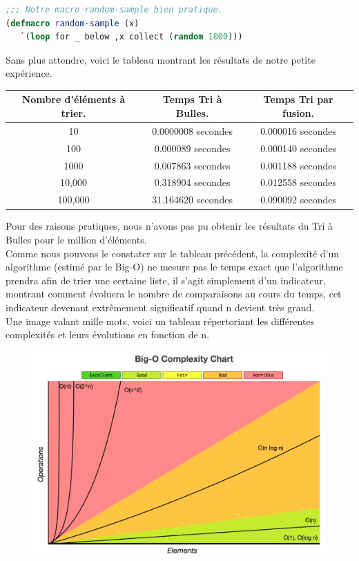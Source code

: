 \documentclass[a4paper, 12pt]{article}
\numberwithin{equation}{subsection}
\begin{document}
\begin{lstlisting}[language=Lisp]
;;; Notre macro random-sample bien pratique.
(defmacro random-sample (x)
   `(loop for _ below ,x collect (random 1000)))
\end{lstlisting}
Sans plus attendre, voici le tableau montrant les résultats de notre petite expérience.
\begin{table}[H]
  \begin{tabular}{|c|c|c|}
    \hline {\bf Nombre d'éléments à trier.} & {\bf Temps Tri à Bulles.} & {\bf Temps Tri par fusion.} \\
    \hline 10 & 0.0000008 secondes & 0.000016 secondes \\
    100 & 0.000089 secondes & 0.000140 secondes \\
    1000 & 0.007863 secondes & 0.001188 secondes \\
    10,000 & 0.318904 secondes & 0.012558 secondes \\
    100,000 & 31.164620 secondes & 0.090092 secondes \\
    \hline
  \end{tabular}
\end{table} \smallskip
Pour des raisons pratiques, nous n'avons pas pu obtenir les résultats du Tri à Bulles pour le million d'éléments. \\

Comme nous pouvons le constater sur le tableau précédent, la complexité d'un algorithme (estimé par le Big-O) ne mesure pas le temps exact que l'algorithme prendra afin de trier une certaine liste, il s'agit simplement d'un indicateur, montrant comment évoluera le nombre de comparaisons au cours du temps, cet indicateur devenant extrêmement significatif quand n devient très grand. \\

Une image valant mille mots, voici un tableau répertoriant les différentes complexités et leurs évolutions en fonction de n.
\begin{figure}[H]
  \centering
  \includegraphics[scale=0.3]{imgs/big-o.jpg}
\end{figure}
\end{document}
